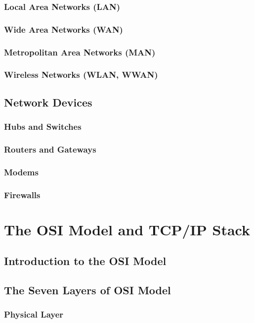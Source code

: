 \documentclass{book}
\begin{document}
        \subsection{Local Area Networks (LAN)}
        \subsection{Wide Area Networks (WAN)}
        \subsection{Metropolitan Area Networks (MAN)}
        \subsection{Wireless Networks (WLAN, WWAN)}
    \section{Network Devices}
        \subsection{Hubs and Switches}
        \subsection{Routers and Gateways}
        \subsection{Modems}
        \subsection{Firewalls}
        
\chapter{The OSI Model and TCP/IP Stack}
    \section{Introduction to the OSI Model}
    \section{The Seven Layers of OSI Model}
        \subsection{Physical Layer}
\end{document}
